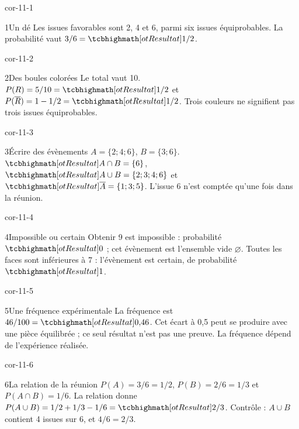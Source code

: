 \clearpage\pagestyle{otMain}\fontsize{11}{15}\selectfont{}
\begin{blocLivre}{cor-11-1}\begin{corrige}{1}{Un dé}
Les issues favorables sont 2, 4 et 6, parmi six issues équiprobables. La probabilité vaut $3/6=\res{1/2}$.
\end{corrige}\end{blocLivre}
\begin{blocLivre}{cor-11-2}\begin{corrige}{2}{Des boules colorées}
Le total vaut 10. $P(R)=5/10=\res{1/2}$ et $P(\overline R)=1-1/2=\res{1/2}$. Trois couleurs ne signifient pas trois issues équiprobables.
\end{corrige}\end{blocLivre}
\begin{blocLivre}{cor-11-3}\begin{corrige}{3}{Écrire des évènements}
$A=\{2;4;6\}$, $B=\{3;6\}$. $\res{A\cap B=\{6\}}$, $\res{A\cup B=\{2;3;4;6\}}$ et $\res{\overline A=\{1;3;5\}}$. L’issue 6 n’est comptée qu’une fois dans la réunion.
\end{corrige}\end{blocLivre}
\begin{blocLivre}{cor-11-4}\begin{corrige}{4}{Impossible ou certain}
Obtenir 9 est impossible : probabilité $\res0$ ; cet évènement est l’ensemble vide $\varnothing$. Toutes les faces sont inférieures à 7 : l’évènement est certain, de probabilité $\res1$.
\end{corrige}\end{blocLivre}
\begin{blocLivre}{cor-11-5}\begin{corrige}{5}{Une fréquence expérimentale}
La fréquence est $46/100=\res{0{,}46}$. Cet écart à 0,5 peut se produire avec une pièce équilibrée ; ce seul résultat n’est pas une preuve. La fréquence dépend de l’expérience réalisée.
\end{corrige}\end{blocLivre}
\begin{blocLivre}{cor-11-6}\begin{corrige}{6}{La relation de la réunion}
$P(A)=3/6=1/2$, $P(B)=2/6=1/3$ et $P(A\cap B)=1/6$. La relation donne $P(A\cup B)=1/2+1/3-1/6=\res{2/3}$. Contrôle : $A\cup B$ contient 4 issues sur 6, et $4/6=2/3$.
\end{corrige}\end{blocLivre}
